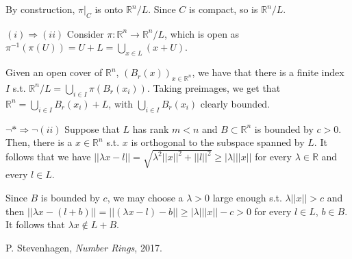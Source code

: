 \documentclass{article}
\newcommand{\numberset}{\mathbb}
\newcommand{\R}{\numberset{R}}
\begin{document}
By construction, $\pi|_C$ is onto $\R^n/L$. Since $C$ is compact, so is $\R^n/L$.

$(i)\Rightarrow (ii)$ Consider $\pi:\R^n\rightarrow\R^n/L$, which is open as $\pi^{-1}(\pi(U))=U+L=\bigcup_{x\in L} (x+U)$.

Given an open cover of $\R^n$, $(B_r(x))_{x\in\R^n}$, we have that there is a finite index $I$ s.t. $\R^n/L=\bigcup_{i\in I} \pi(B_r(x_i))$. Taking preimages, we get that $\R^n=\bigcup_{i\in I} B_r(x_i)+L$, with $\bigcup_{i\in I} B_r(x_i)$ clearly bounded.

$\neg *\Rightarrow\neg (ii)$ Suppose that $L$ has rank $m<n$ and $B\subset\R^n$ is bounded by $c>0$. Then, there is a $x\in\R^n$ s.t. $x$ is orthogonal to the subspace spanned by $L$. It follows that we have $||\lambda x-l||=\sqrt{\lambda^2||x||^2+||l||^2}\geq |\lambda|||x||$ for every $\lambda\in\R$ and every $l\in L$.

Since $B$ is bounded by $c$, we may choose a $\lambda>0$ large enough s.t. $\lambda||x||>c$ and then $||\lambda x-(l+b)||=||(\lambda x-l)-b||\geq |\lambda|||x||-c>0$ for every $l\in L$, $b\in B$. It follows that $\lambda x\not\in L+B$.


\begin{thebibliography}{9}
		P. Stevenhagen,
		\textit{Number Rings},
		2017.
\end{thebibliography}
\end{document}
